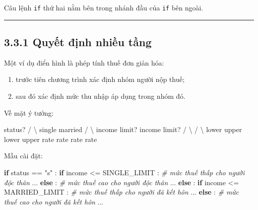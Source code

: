 \documentclass[
  11pt,
  a4paper,
]{article}
\newenvironment{Shaded}{}{}
\newcommand{\CommentTok}[1]{\textcolor[rgb]{0.38,0.63,0.69}{\textit{#1}}}
\newcommand{\ControlFlowTok}[1]{\textcolor[rgb]{0.00,0.44,0.13}{\textbf{#1}}}
\newcommand{\NormalTok}[1]{#1}
\newcommand{\OperatorTok}[1]{\textcolor[rgb]{0.40,0.40,0.40}{#1}}
\newcommand{\StringTok}[1]{\textcolor[rgb]{0.25,0.44,0.63}{#1}}
\providecommand{\tightlist}{%
  \setlength{\itemsep}{0pt}\setlength{\parskip}{0pt}}
\begin{document}
Câu lệnh \texttt{if} thứ hai nằm bên trong nhánh đầu của \texttt{if} bên
ngoài.

\begin{center}\rule{0.5\linewidth}{0.5pt}\end{center}

\subsection{3.3.1 Quyết định nhiều
tầng}\label{quyux1ebft-ux111ux1ecbnh-nhiux1ec1u-tux1ea7ng}

Một ví dụ điển hình là phép tính thuế đơn giản hóa:

\begin{enumerate}
\def\labelenumi{\arabic{enumi}.}
\tightlist
\item
  trước tiên chương trình xác định nhóm người nộp thuế;
\item
  sau đó xác định mức thu nhập áp dụng trong nhóm đó.
\end{enumerate}

Về mặt ý tưởng:

\begin{Shaded}
\begin{Highlighting}[]
\NormalTok{                     status?}
\NormalTok{                 /             \textbackslash{}}
\NormalTok{             single           married}
\NormalTok{              /                  \textbackslash{}}
\NormalTok{        income limit?        income limit?}
\NormalTok{          /      \textbackslash{}             /      \textbackslash{}}
\NormalTok{      lower     upper       lower     upper}
\NormalTok{      rate      rate        rate      rate}
\end{Highlighting}
\end{Shaded}

Mẫu cài đặt:

\begin{Shaded}
\begin{Highlighting}[]
\ControlFlowTok{if}\NormalTok{ status }\OperatorTok{==} \StringTok{"s"}\NormalTok{ :}
    \ControlFlowTok{if}\NormalTok{ income }\OperatorTok{\textless{}=}\NormalTok{ SINGLE\_LIMIT :}
        \CommentTok{\# mức thuế thấp cho người độc thân}
\NormalTok{        ...}
    \ControlFlowTok{else}\NormalTok{ :}
        \CommentTok{\# mức thuế cao cho người độc thân}
\NormalTok{        ...}
\ControlFlowTok{else}\NormalTok{ :}
    \ControlFlowTok{if}\NormalTok{ income }\OperatorTok{\textless{}=}\NormalTok{ MARRIED\_LIMIT :}
        \CommentTok{\# mức thuế thấp cho người đã kết hôn}
\NormalTok{        ...}
    \ControlFlowTok{else}\NormalTok{ :}
        \CommentTok{\# mức thuế cao cho người đã kết hôn}
\NormalTok{        ...}
\end{Highlighting}
\end{Shaded}
\end{document}
